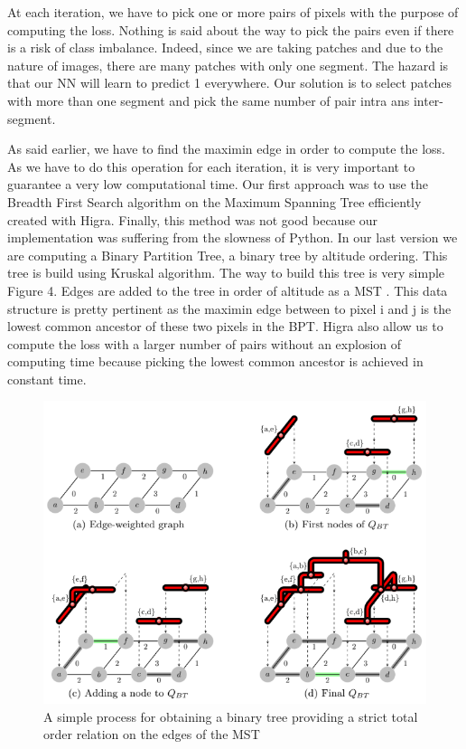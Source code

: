 At each iteration, we have to pick one or more pairs of pixels with the purpose of computing the loss. Nothing is said about the way to pick the pairs even if there is a risk of class imbalance. Indeed, since we are taking patches and due to the nature of images, there are many patches with only one segment. The hazard is that our NN will learn to predict 1 everywhere. Our solution is to select patches with more than one segment and pick the same number of pair intra ans inter-segment.

As said earlier, we have to find the maximin edge in order to compute the loss. As we have to do this operation for each iteration, it is very important to guarantee a very low computational time. Our first approach was to use the Breadth First Search algorithm on the Maximum Spanning Tree efficiently created with Higra. Finally, this method was not good because our implementation was suffering from the slowness of Python. 
In our last version we are computing a Binary Partition Tree, a binary tree by altitude ordering. This tree is build using Kruskal algorithm. The way to build this tree is very simple Figure 4. Edges are added to the tree in order of altitude as a MST \cite{najman_playing_2013}. This data structure is pretty pertinent as the maximin edge between to pixel i and j is the lowest common ancestor of these two pixels in the BPT. Higra also allow us to compute the loss with a larger number of pairs without an explosion of computing time because picking the lowest common ancestor is achieved in constant time.

\begin{figure}[!htbp]
	\centering
	\includegraphics[width=0.7\linewidth]{./images/bpt.png}
	\caption{A simple process for obtaining a binary tree providing a strict total order relation on the edges of the MST~\cite{najman_playing_2013}}%
	\label{fig:bpt_method}
\end{figure}

